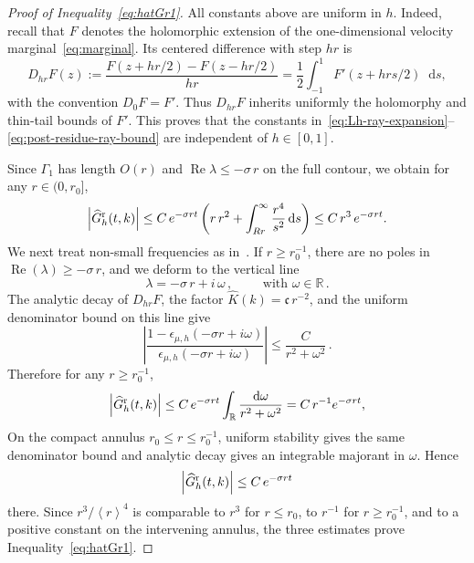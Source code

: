 \documentclass[a4paper,12pt]{amsart} %
\theoremstyle{plain}
\theoremstyle{definition}
\newcommand		{\RR}		{\mathbb R}			%
\newcommand		{\R}		{\RR}
\newcommand		{\lt}			{\left}				%
\newcommand		{\rt}			{\right}			%
\renewcommand	{\(}			{\lt(}
\renewcommand	{\)}			{\rt)}
\newcommand		{\bangle}[1]	{\lt\langle #1\rt\rangle}
\newcommand		{\weight}[1]	{\bangle{#1}}	%
\newcommand		{\n}[1]			{\lt\lvert{#1}\rt\rvert}	%
\renewcommand		{\d}		{\mathop{}\!\mathrm{d}}		%
\DeclareMathOperator{\re}		{Re}				%
\renewcommand	{\Re}[1]		{\re\!\( #1 \)}		%
\newcommand	{\h}			{h}
\newcommand		{\CK}			{\mathfrak{c}}	%
\newcommand		{\hatG}			{\widehat{G}}
\newcommand		{\hatGr}		{\hatG^{\textnormal{r}}}
\begin{document}
\begin{proof}[Proof of Inequality~\eqref{eq:hatGr1}]
		All constants above are uniform in $\h$. Indeed, recall that $F$ denotes the holomorphic extension of the one-dimensional velocity marginal~\eqref{eq:marginal}. Its centered difference with step $hr$ is
		\begin{equation*}
			D_{hr}F(z) := \frac{F(z+hr/2)-F(z-hr/2)}{hr} =\frac12\int_{-1}^{1}F'(z+hrs/2)\d s,
		\end{equation*}
		with the convention $D_0F=F'$. Thus $D_{hr}F$ inherits uniformly the holomorphy and thin-tail bounds of $F'$. This proves that the constants in~\eqref{eq:Lh-ray-expansion}--\eqref{eq:post-residue-ray-bound} are independent of $h\in[0,1]$.

		Since $\Gamma_1$ has length $O(r)$ and $\re\lambda\leq-\sigma\, r$ on the full contour, we obtain for any $r\in(0,r_0]$,
		\begin{equation*}
			\n{\hatGr_\h(t,k)} \leq C \, e^{-\sigma rt} \lt(r\,r^2 + \int_{Rr}^{\infty}\frac{r^4}{s^2} \d s\rt) \leq C \, r^3 \, e^{-\sigma rt}.
		\end{equation*}
		We next treat non-small frequencies as in~\cite[Lemma~2.8]{bedrossian_linearized_2022}. If $r\geq r_0^{-1}$, there are no poles in $\Re\lambda\geq-\sigma\, r$, and we deform to the vertical line
		\begin{equation*}
			\lambda=-\sigma\, r+i\,\omega\, , \qquad \text{ with } \omega\in\R \, .
		\end{equation*}
		The analytic decay of $D_{hr}F$, the factor $\widehat K(k)=\CK\, r^{-2}$, and the uniform denominator bound on this line give
		\begin{equation}\label{eq:non-small-resolvent-integrand}
			\n{\frac{1-\epsilon_{\mu,\h}(-\sigma r+i\omega)}{\epsilon_{\mu,\h}(-\sigma r+i\omega)}} \leq \frac{C}{r^2+\omega^2} \, .
		\end{equation}
		Therefore for any $r\geq r_0^{-1}$,
		\begin{equation*}
			\n{\hatGr_\h(t,k)} \leq C\, e^{-\sigma rt} \int_\R \frac{\d\omega}{r^2+\omega^2} = C \, r^{-1} e^{-\sigma rt},
		\end{equation*}
		On the compact annulus $r_0\leq r\leq r_0^{-1}$, uniform stability gives the same denominator bound and analytic decay gives an integrable majorant in $\omega$. Hence
		\begin{equation*}
			\n{\hatGr_\h(t,k)}\leq C \, e^{-\sigma rt}
		\end{equation*}
		there. Since $r^3/\weight{r}^4$ is comparable to $r^3$ for $r\leq r_0$, to $r^{-1}$ for $r\geq r_0^{-1}$, and to a positive constant on the intervening annulus, the three estimates prove Inequality~\eqref{eq:hatGr1}.
	\end{proof}
\end{document}
